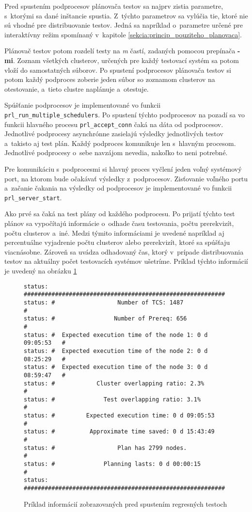 Pred spustením podprocesov plánovača testov sa najprv zistia parametre, s~ktorými sa dané 
inštancie spustia. Z~týchto parametrov sa vylúčia tie, ktoré nie sú vhodné pre
distribuovanie testov. Jedná sa napríklad o~parametre určené pre interaktívny režim spomínaný v~kapitole 
\ref{sekcia:princip_pouziteho_planovaca}.

Plánovač testov potom rozdelí testy na \textit{m} častí, zadaných pomocou prepínača \textbf{-mi}.
Zoznam všetkých clusterov, určených pre každý testovací systém sa potom vloží do samostatných súborov.
Po spustení podprocesov plánovača testov si potom každý podproces zoberie jeden súbor so zoznamom 
clusterov na otestovanie, a~tieto clustre naplánuje a~otestuje.

Spúšťanie podprocesov je implementované vo funkcii \texttt{prl\_run\_multiple\_schedulers}.
Po spustení týchto podprocesov na pozadí sa vo funkcii hlavného procesu \texttt{prl\_accept\_conn} čaká na dáta od podprocesov.
Jednotlivé podprocesy asynchrónne zasielajú výsledky jednotlivých testov a~takisto aj test plán.
Každý podproces komunikuje len s~hlavným procesom. Jednotlivé podprocesy o~sebe navzájom nevedia,
nakoľko to neni potrebné. 

Pre komunikáciu s~podprocesmi si hlavný proces vyčlení jeden voľný systémový port,
na ktorom bude očakávať výsledky z~podprocesov. 
Zisťovanie voľného portu a~začanie čakania na výsledky od podprocesov je implementované vo funkcii \texttt{prl\_server\_start}.

Ako prvé sa čaká na test plány od každého podprocesu. Po prijatí týchto test plánov sa vypočítajú informácie
o~odhade času testovania, počtu prerekvizít, počtu clusterov a~iné.
Medzi týmito informáciami je uvedené napríklad aj percentuálne vyjadrenie počtu clusterov alebo prerekvizít,
ktoré sa spúšťaju viacnásobne. Zároveň sa uvádza odhadovaný čas, ktorý v~prípade distribuovania testov
na aktuálny počet testovacích systémov ušetríme. Príklad týchto informácií je uvedený na obrázku \ref{obrazok:ukazka_statistiky}

\begin{figure}[h]
\begin{lstlisting}
status: ##########################################################
status: #                  Number of TCS: 1487                   #
status: #                 Number of Prereq: 656                  #
status: #  Expected execution time of the node 1: 0 d 09:05:53   #
status: #  Expected execution time of the node 2: 0 d 08:25:29   #
status: #  Expected execution time of the node 3: 0 d 08:59:47   #
status: #            Cluster overlapping ratio: 2.3%             #
status: #              Test overlapping ratio: 3.1%              #
status: #         Expected execution time: 0 d 09:05:53          #
status: #          Approximate time saved: 0 d 15:43:49          #
status: #                  Plan has 2799 nodes.                  #
status: #              Planning lasts: 0 d 00:00:15              #
status: ##########################################################
\end{lstlisting}
\caption{Príklad informácií zobrazovaných pred spustením regresných testoch}
\label{obrazok:ukazka_statistiky}
\end{figure}


